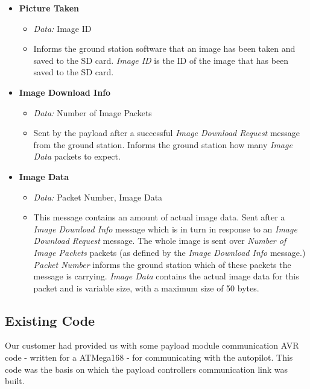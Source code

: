 \begin{itemize}

\item \textbf{Picture Taken}

\begin{itemize}
\item \emph{Data:} Image ID

\item Informs the ground station software that an image has been taken and 
saved to the SD card. \emph{Image ID} is the ID of the image that has been 
saved to the SD card.
\end{itemize} 

\item \textbf{Image Download Info}

\begin{itemize}

\item \emph{Data:} Number of Image Packets

\item Sent by the payload after a successful \emph{Image Download Request}
message from the ground station. Informs the ground station how many 
\emph{Image Data} packets to expect.
\end{itemize}

\item \textbf{Image Data} 
\begin{itemize}
\item \emph{Data:} Packet Number, Image Data
\item This message contains an amount of actual image data. Sent after a
\emph{Image Download Info} message which is in turn in response to an 
\emph{Image Download Request} message. The whole image is sent over
\emph{Number of Image Packets} packets (as defined by the \emph{Image Download
Info} message.) \emph{Packet Number} informs the ground station which of these
packets the message is carrying. \emph{Image Data} contains the actual image 
data for this packet and is variable size, with a maximum size of 50 bytes. 
\end{itemize}

\end{itemize}


\subsection{Existing Code}
\label{sec:payload_existing_code}
Our customer had provided us with some payload module communication AVR code
- written for a ATMega168 - for communicating with the autopilot. This code
was the basis on which the payload controllers communication link was built.

